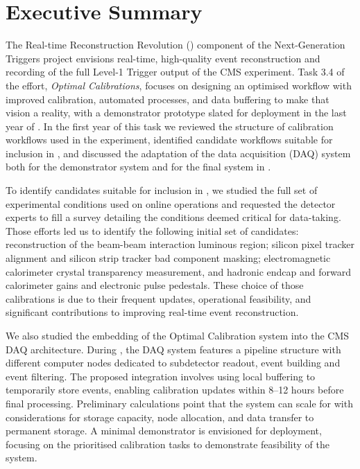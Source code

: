 \chapter{Executive Summary}

The Real-time Reconstruction Revolution (\Rthree) component of the Next-Generation Triggers project envisions real-time, high-quality event reconstruction and recording of the full Level-1 Trigger output of the CMS experiment.
Task 3.4 of the \Rthree effort, \emph{Optimal Calibrations}, focuses on
designing an optimised workflow with improved calibration, automated processes, and data buffering to make that vision a reality,
with a demonstrator prototype slated for deployment in the last year of \Runthree.
In the first year of this task we 
reviewed the structure of calibration workflows used in the experiment, 
identified candidate workflows suitable for inclusion in \Rthree, and
discussed the adaptation of the data acquisition (DAQ) system both for the demonstrator system and
for the final system in \Phasetwo.

To identify candidates suitable for inclusion in \Rthree, 
we studied the full set of experimental conditions used on online operations and 
requested the detector experts to fill a survey detailing the conditions deemed critical for data-taking.
Those efforts led us to identify the following initial set of candidates:
reconstruction of the beam-beam interaction luminous region;
silicon pixel tracker alignment and
silicon strip tracker bad component masking;
electromagnetic calorimeter crystal transparency measurement, 
and
hadronic endcap and forward calorimeter gains and electronic pulse pedestals.
These choice of those calibrations is due to their frequent updates, 
operational feasibility, 
and significant contributions to improving real-time event reconstruction.

We also studied the embedding of the Optimal Calibration system into the CMS DAQ architecture. 
During \Runthree, the DAQ system features a pipeline structure with different computer nodes dedicated to subdetector readout,
event building and
event filtering. 
The proposed integration involves using local buffering to temporarily store events, enabling calibration updates within 8--12 hours before final processing.
Preliminary calculations point that the system can scale for \Phasetwo with considerations for storage capacity, node allocation, and data transfer to permanent storage. 
A minimal demonstrator is envisioned for deployment, focusing on the prioritised calibration tasks to demonstrate feasibility of the system.